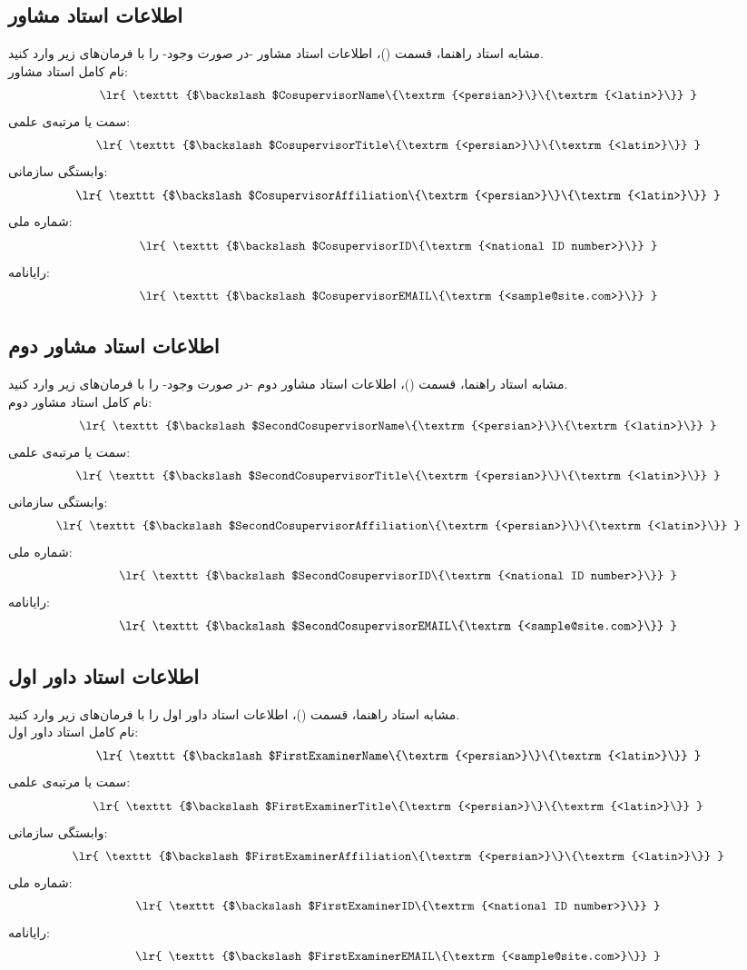 \documentclass[12pt,a4paper,twoside,fleqn,notitlepage,openany]{extbook}
\begin{document}
\subsection{اطلاعات استاد مشاور}
مشابه استاد راهنما، قسمت ()، اطلاعات استاد مشاور -در صورت وجود- را با فرمان‌های زیر وارد کنید\@. \\
نام کامل استاد مشاور:
\[ \textrm{ \lr{ \texttt{$\backslash$CosupervisorName\{\textrm{<persian>}\}\{\textrm{<latin>}\}} } } \]
سمت یا مرتبه‌ی علمی:
\[ \textrm{ \lr{ \texttt{$\backslash$CosupervisorTitle\{\textrm{<persian>}\}\{\textrm{<latin>}\}} } } \]
وابستگی سازمانی:
\[ \textrm{ \lr{ \texttt{$\backslash$CosupervisorAffiliation\{\textrm{<persian>}\}\{\textrm{<latin>}\}} } } \]
شماره ملی:
\[ \textrm{ \lr{ \texttt{$\backslash$CosupervisorID\{\textrm{<national ID number>}\}} } } \]
رایانامه:
\[ \textrm{ \lr{ \texttt{$\backslash$CosupervisorEMAIL\{\textrm{<sample@site.com>}\}} } } \]
\subsection{اطلاعات استاد مشاور دوم}
مشابه استاد راهنما، قسمت ()، اطلاعات استاد مشاور دوم -در صورت وجود- را با فرمان‌های زیر وارد کنید\@. \\
نام کامل استاد مشاور دوم:
\[ \textrm{ \lr{ \texttt{$\backslash$SecondCosupervisorName\{\textrm{<persian>}\}\{\textrm{<latin>}\}} } } \]
سمت یا مرتبه‌ی علمی:
\[ \textrm{ \lr{ \texttt{$\backslash$SecondCosupervisorTitle\{\textrm{<persian>}\}\{\textrm{<latin>}\}} } } \]
وابستگی سازمانی:
\[ \textrm{ \lr{ \texttt{$\backslash$SecondCosupervisorAffiliation\{\textrm{<persian>}\}\{\textrm{<latin>}\}} } } \]
شماره ملی:
\[ \textrm{ \lr{ \texttt{$\backslash$SecondCosupervisorID\{\textrm{<national ID number>}\}} } } \]
رایانامه:
\[ \textrm{ \lr{ \texttt{$\backslash$SecondCosupervisorEMAIL\{\textrm{<sample@site.com>}\}} } } \]
\subsection{اطلاعات استاد داور اول}
مشابه استاد راهنما، قسمت ()، اطلاعات استاد داور اول را با فرمان‌های زیر وارد کنید\@. \\
نام کامل استاد داور اول:
\[ \textrm{ \lr{ \texttt{$\backslash$FirstExaminerName\{\textrm{<persian>}\}\{\textrm{<latin>}\}} } } \]
سمت یا مرتبه‌ی علمی:
\[ \textrm{ \lr{ \texttt{$\backslash$FirstExaminerTitle\{\textrm{<persian>}\}\{\textrm{<latin>}\}} } } \]
وابستگی سازمانی:
\[ \textrm{ \lr{ \texttt{$\backslash$FirstExaminerAffiliation\{\textrm{<persian>}\}\{\textrm{<latin>}\}} } } \]
شماره ملی:
\[ \textrm{ \lr{ \texttt{$\backslash$FirstExaminerID\{\textrm{<national ID number>}\}} } } \]
رایانامه:
\[ \textrm{ \lr{ \texttt{$\backslash$FirstExaminerEMAIL\{\textrm{<sample@site.com>}\}} } } \]
\end{document}
